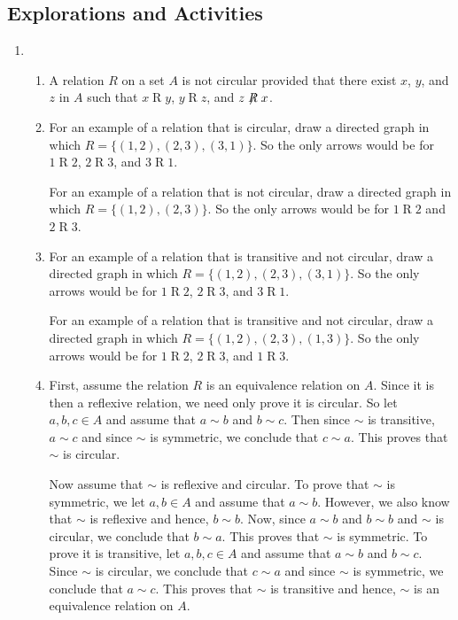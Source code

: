 \subsection*{Explorations and Activities}
\setcounter{oldenumi}{\theenumi}
\begin{enumerate} \setcounter{enumi}{\theoldenumi}
\item \begin{enumerate}
\item A relation $R$ on a set $A$ is not circular provided that there exist $x$, $y$, and $z$ in $A$ such that 
$x \mathrel{R} y$, $y \mathrel{R} z$, and $z \mathrel{\not \negthickspace R} x$.

\item For an example of a relation that is circular, draw a directed graph in which $R = \{ (1, 2), (2, 3), (3, 1) \}$.  So the only arrows would be for  $1 \mathrel{R} 2$, $2 \mathrel{R} 3$, and $3 \mathrel{R} 1$.

\noindent
For an example of a relation that is not circular, draw a directed graph in which $R = \{ (1, 2), (2, 3) \}$.  So the only arrows would be for  $1 \mathrel{R} 2$ and  $2 \mathrel{R} 3$.

\item For an example of a relation that is transitive and not circular, draw a directed graph in which $R = \{ (1, 2), (2, 3), (3, 1) \}$.  So the only arrows would be for  $1 \mathrel{R} 2$, $2 \mathrel{R} 3$, and $3 \mathrel{R} 1$.

\noindent
For an example of a relation that is transitive and not circular, draw a directed graph in which $R = \{ (1, 2), (2, 3), (1, 3) \}$.  So the only arrows would be for  $1 \mathrel{R} 2$, $2 \mathrel{R} 3$, and $1 \mathrel{R} 3$.


  
\item First, assume the relation $R$ is an equivalence relation on $A$.  Since it is then a reflexive relation, we need only prove it is circular.  So let $a, b, c \in A$ and assume that 
$a \sim b$ and $b \sim c$.  Then since $\sim$ is transitive, $a \sim c$ and since $\sim$ is symmetric, we conclude that $c \sim a$.  This proves that $\sim$ is circular.

Now assume that $\sim$ is reflexive and circular.  To prove that $\sim$ is symmetric, we let 
$a, b \in A$ and assume that $a \sim b$.  However, we also know that $\sim$ is reflexive and hence, $b \sim b$.  Now, since $a \sim b$ and $b \sim b$ and $\sim$ is circular, we conclude that $b \sim a$.  This proves that $\sim$ is symmetric.  To prove it is transitive, let 
$a, b, c \in A$ and assume that $a \sim b$ and $b \sim c$.  Since $\sim$ is circular, we conclude that $c \sim a$ and since $\sim$ is symmetric, we conclude that $a \sim c$.  This proves that $\sim$ is transitive and hence, $\sim$ is an equivalence relation on $A$.




\end{enumerate}
\end{enumerate}
